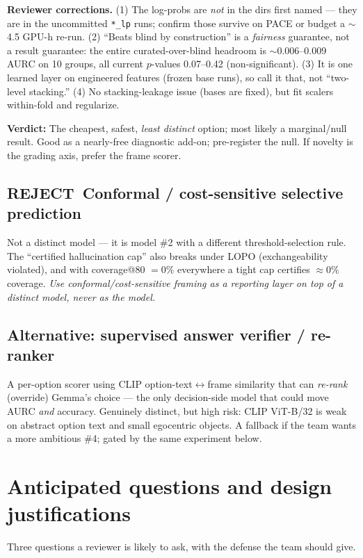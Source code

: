 \documentclass[11pt]{article}
\newcommand{\verdict}[2]{\par\smallskip\noindent\textbf{\color{#1}Verdict:} #2\par}
\newcommand{\rej}{\textbf{\color{hsred}REJECT}}
\newcommand{\code}[1]{\texttt{#1}}
\begin{document}
\textbf{Reviewer corrections.} (1) The log-probs are \emph{not} in the dirs first named --- they are in the uncommitted \code{*\_lp} runs; confirm those survive on PACE or budget a $\sim$4.5 GPU-h re-run. (2) ``Beats blind by construction'' is a \emph{fairness} guarantee, not a result guarantee: the entire curated-over-blind headroom is $\sim$0.006--0.009 AURC on 10 groups, all current $p$-values 0.07--0.42 (non-significant). (3) It is one learned layer on engineered features (frozen base runs), so call it that, not ``two-level stacking.'' (4) No stacking-leakage issue (bases are fixed), but fit scalers within-fold and regularize.

\verdict{hsblue}{The cheapest, safest, \emph{least distinct} option; most likely a marginal/null result. Good as a nearly-free diagnostic add-on; pre-register the null. If novelty is the grading axis, prefer the frame scorer.}

\subsection{\rej\ Conformal / cost-sensitive selective prediction}
Not a distinct model --- it is model \#2 with a different threshold-selection rule. The ``certified hallucination cap'' also breaks under LOPO (exchangeability violated), and with coverage@80 $=0\%$ everywhere a tight cap certifies $\approx0\%$ coverage. \emph{Use conformal/cost-sensitive framing as a reporting layer on top of a distinct model, never as the model.}

\subsection{Alternative: supervised answer verifier / re-ranker}
A per-option scorer using CLIP option-text$\leftrightarrow$frame similarity that can \emph{re-rank} (override) Gemma's choice --- the only decision-side model that could move AURC \emph{and} accuracy. Genuinely distinct, but high risk: CLIP ViT-B/32 is weak on abstract option text and small egocentric objects. A fallback if the team wants a more ambitious \#4; gated by the same experiment below.

\section{Anticipated questions and design justifications}
Three questions a reviewer is likely to ask, with the defense the team should give.
\end{document}
